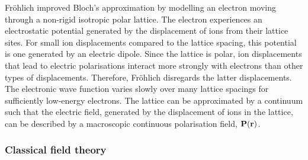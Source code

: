 Fr\"ohlich improved Bloch's approximation by modelling an electron moving through a non-rigid isotropic polar lattice. The electron experiences an electrostatic potential generated by the displacement of ions from their lattice sites. For small ion displacements compared to the lattice spacing, this potential is one generated by an electric dipole. Since the lattice is polar, ion displacements that lead to electric polarisations interact more strongly with electrons than other types of displacements. Therefore, Fr\"ohlich disregards the latter displacements. The electronic wave function varies slowly over many lattice spacings for sufficiently low-energy electrons. The lattice can be approximated by a continuum such that the electric field, generated by the displacement of ions in the lattice, can be described by a macroscopic continuous polarisation field, $\vb{P}(\vb{r})$. 

\subsubsection{Classical field theory}
\label{subsubsec:2-1-2-1}

